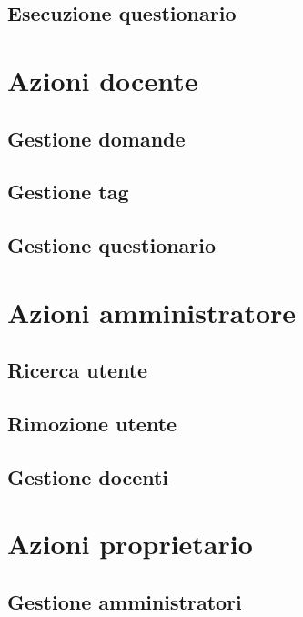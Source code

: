\documentclass[12pt,a4paper]{article}
\begin{document}
	\subsection{Esecuzione questionario}
	\newpage
	\section{Azioni docente}
    \subsection{Gestione domande}
	\subsection{Gestione tag}
	\subsection{Gestione questionario}
	\newpage
	\section{Azioni amministratore}
	\subsection{Ricerca utente}
	\subsection{Rimozione utente}
	\subsection{Gestione docenti}

\newpage
	\section{Azioni proprietario}
	\subsection{Gestione  amministratori}
	
	
	


	
\end{document}
